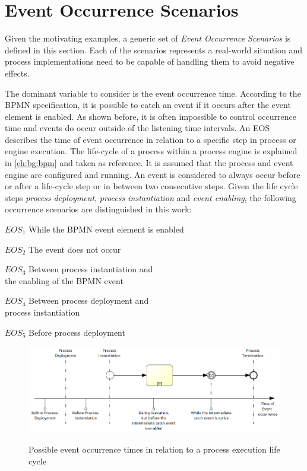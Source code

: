 \section{Event Occurrence Scenarios}\label{ch:ps:eos}
Given the motivating examples, a generic set of \textit{Event Occurrence Scenarios} is defined in this section. 
Each of the scenarios represents a real-world situation and process implementations need to be capable of handling them to avoid negative effects.

\medskip \noindent
The dominant variable to consider is the event occurrence time.
According to the BPMN specification, it is possible to catch an event if it occurs after the event element is enabled. As shown before, it is often impossible to control occurrence time and events do occur outside of the listening time intervals.
An \ac{EOS} describes the time of event occurrence in relation to a specific step in process or engine execution.
The life-cycle of a process within a process engine is explained in \autoref{ch:bg:bpm} and taken as reference. It is assumed that the process and event engine are configured and running.
An event is considered to always occur before or after a life-cycle step or in between two consecutive steps. 
Given the life cycle steps \textit{process deployment}, \textit{process instantiation} and \textit{event enabling}, the following occurrence scenarios are distinguished in this work:

\begin{aenumerate}
	\item[$EOS_{1}$] While the BPMN event element is enabled
	\item[$EOS_{2}$] The event does not occur
	\item[$EOS_{3}$] Between process instantiation and \\the enabling of the BPMN event
	\item[$EOS_{4}$] Between process deployment and \\process instantiation
	\item[$EOS_{5}$] Before process deployment
\end{aenumerate}\label{def:occurrence-times}

\begin{figure}[]
	\myfloatalign
	{\includegraphics[width=1\linewidth]{chapters/requirements/timeline-event-occurrence.png}}
	\caption{Possible event occurrence times in relation to a process execution life cycle}
	\label{fig:occurrence-timeline}
\end{figure}

